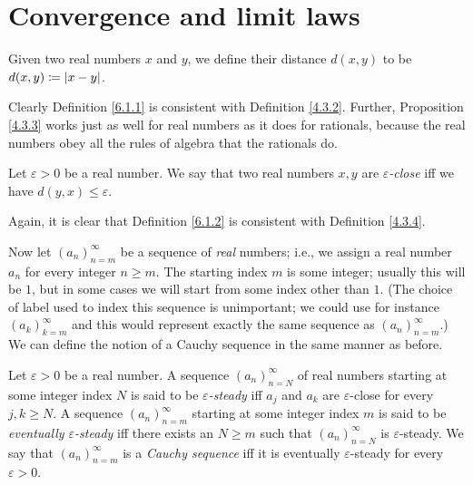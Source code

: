 \section{Convergence and limit laws}\label{sec 6.1}

\begin{definition}\label{6.1.1}
    Given two real numbers \(x\) and \(y\), we define their distance \(d(x, y)\) to be \(d(x, y) \coloneqq \left\lvert x - y\right\rvert\).
\end{definition}

\begin{note}
    Clearly Definition \ref{6.1.1} is consistent with Definition \ref{4.3.2}.
    Further, Proposition \ref{4.3.3} works just as well for real numbers as it does for rationals, because the real numbers obey all the rules of algebra that the rationals do.
\end{note}

\begin{definition}\label{6.1.2}
    Let \(\varepsilon > 0\) be a real number.
    We say that two real numbers \(x, y\) are \emph{\(\varepsilon\)-close} iff we have \(d(y, x) \leq \varepsilon\).
\end{definition}

\begin{note}
    Again, it is clear that Definition \ref{6.1.2} is consistent with Definition \ref{4.3.4}.
\end{note}

\begin{note}
    Now let \((a_n)_{n = m}^\infty\) be a sequence of \emph{real} numbers;
    i.e., we assign a real number \(a_n\) for every integer \(n \geq m\).
    The starting index \(m\) is some integer;
    usually this will be \(1\), but in some cases we will start from some index other than \(1\).
    (The choice of label used to index this sequence is unimportant; we could use for instance \((a_k)_{k = m}^{\infty}\) and this would represent exactly the same sequence as \((a_n)_{n = m}^{\infty}\).)
    We can define the notion of a Cauchy sequence in the same manner as before.
\end{note}

\begin{definition}\label{6.1.3}
    Let \(\varepsilon > 0\) be a real number.
    A sequence \((a_n)_{n = N}^\infty\) of real numbers starting at some integer index \(N\) is said to be \emph{\(\varepsilon\)-steady} iff \(a_j\) and \(a_k\) are \(\varepsilon\)-close for every \(j, k \geq N\).
    A sequence \((a_n)_{n = m}^\infty\) starting at some integer index \(m\) is said to be \emph{eventually \(\varepsilon\)-steady} iff there exists an \(N \geq m\) such that \((a_n)_{n = N}^\infty\) is \(\varepsilon\)-steady.
    We say that \((a_n)_{n = m}^\infty\) is a \emph{Cauchy sequence} iff it is eventually \(\varepsilon\)-steady for every \(\varepsilon > 0\).
\end{definition}

